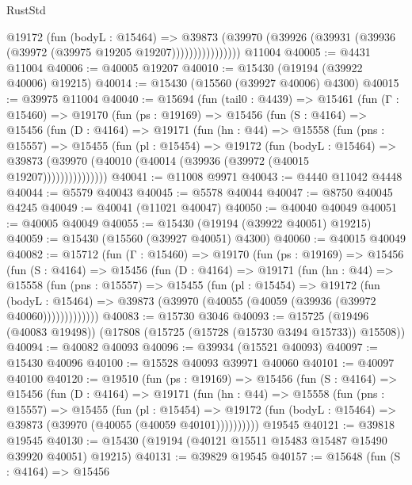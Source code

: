 \begin{lexlean}{RustStd}
\begin{coremodule}
{\begin{coremodule}
{{{{{{{{{{{{{{{{{{{{{{{{{{{{{{{{{{{{{{{{{{{{{{{{{{{{{{{{{{{{                    @19172
                      (fun (bodyL : @15464) =>
                      @39873
                        (@39970
                          (@39926 (@39931 (@39936 (@39972 (@39975 @19205 @19207))))))))))))))))
    @11004
@40005 := @4431 @11004
@40006 := @40005 @19207
@40010 := @15430 (@19194 (@39922 @40006) @19215)
@40014 := @15430 (@15560 (@39927 @40006) @4300)
@40015 := @39975 @11004
@40040 := @15694
    (fun (tail0 : @4439) =>
    @15461
      (fun (Γ : @15460) =>
      @19170
        (fun (ps : @19169) =>
        @15456
          (fun (S : @4164) =>
          @15456
            (fun (D : @4164) =>
            @19171
              (fun (hn : @44) =>
              @15558
                (fun (pns : @15557) =>
                @15455
                  (fun (pl : @15454) =>
                  @19172
                    (fun (bodyL : @15464) =>
                    @39873 (@39970 (@40010 (@40014 (@39936 (@39972 (@40015 @19207)))))))))))))))
@40041 := @11008 @9971
@40043 := @4440 @11042 @4448
@40044 := @5579 @40043
@40045 := @5578 @40044
@40047 := @8750 @40045 @4245
@40049 := @40041 (@11021 @40047)
@40050 := @40040 @40049
@40051 := @40005 @40049
@40055 := @15430 (@19194 (@39922 @40051) @19215)
@40059 := @15430 (@15560 (@39927 @40051) @4300)
@40060 := @40015 @40049
@40082 := @15712
    (fun (Γ : @15460) =>
    @19170
      (fun (ps : @19169) =>
      @15456
        (fun (S : @4164) =>
        @15456
          (fun (D : @4164) =>
          @19171
            (fun (hn : @44) =>
            @15558
              (fun (pns : @15557) =>
              @15455
                (fun (pl : @15454) =>
                @19172
                  (fun (bodyL : @15464) =>
                  @39873 (@39970 (@40055 (@40059 (@39936 (@39972 @40060)))))))))))))
@40083 := @15730 @3046
@40093 := @15725 (@19496 (@40083 @19498)) (@17808 (@15725 (@15728 (@15730 @3494 @15733)) @15508))
@40094 := @40082 @40093
@40096 := @39934 (@15521 @40093)
@40097 := @15430 @40096
@40100 := @15528 @40093 @39971 @40060
@40101 := @40097 @40100
@40120 := @19510
    (fun (ps : @19169) =>
    @15456
      (fun (S : @4164) =>
      @15456
        (fun (D : @4164) =>
        @19171
          (fun (hn : @44) =>
          @15558
            (fun (pns : @15557) =>
            @15455
              (fun (pl : @15454) =>
              @19172 (fun (bodyL : @15464) => @39873 (@39970 (@40055 (@40059 @40101))))))))))
    @19545
@40121 := @39818 @19545
@40130 := @15430 (@19194 (@40121 @15511 @15483 @15487 @15490 @39920 @40051) @19215)
@40131 := @39829 @19545
@40157 := @15648
    (fun (S : @4164) =>
    @15456
}}}}}}}}}}}}}}}}}}}}}}}}}}}}}}}}}}}}}}}}}}}}}}}}}}}}}}}}}}}}
\end{coremodule}}
\end{coremodule}
\end{lexlean}
